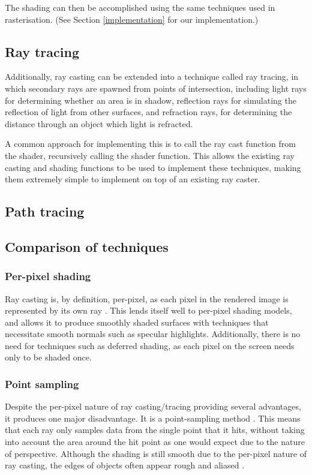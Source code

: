 \let\labelitemi\oldlabelitemi

The shading can then be accomplished using the same techniques used in rasterisation. (See Section \ref{implementation} for our implementation.)

\subsection{Ray tracing}
Additionally, ray casting can be extended into a technique called ray tracing, in which secondary rays are spawned from points of intersection, including light rays for determining whether an area is in shadow, reflection rays for simulating the reflection of light from other surfaces, and refraction rays, for determining the distance through an object which light is refracted.

A common approach for implementing this is to call the ray cast function from the shader, recursively calling the shader function. This allows the existing ray casting and shading functions to be used to implement these techniques, making them extremely simple to implement on top of an existing ray caster.

\subsection{Path tracing}

\subsection{Comparison of techniques}

\subsubsection{Per-pixel shading}
Ray casting is, by definition, per-pixel, as each pixel in the rendered image is represented by its own ray \parencite{appel68raytracing}. This lends itself well to per-pixel shading models, and allows it to produce smoothly shaded surfaces with techniques that necessitate smooth normals such as specular highlights. Additionally, there is no need for techniques such as deferred shading, as each pixel on the screen needs only to be shaded once.

\subsubsection{Point sampling}
Despite the per-pixel nature of ray casting/tracing providing several advantages, it produces one major disadvantage. It is a point-sampling method \parencite{amanatides84conetracing}. This means that each ray only samples data from the single point that it hits, without taking into account the area around the hit point as one would expect due to the nature of perspective. Although the shading is still smooth due to the per-pixel nature of ray casting, the edges of objects often appear rough and aliased \parencite{amanatides84conetracing}.

